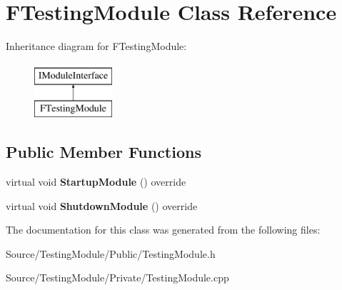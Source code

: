 \hypertarget{class_f_testing_module}{}\section{F\+Testing\+Module Class Reference}
\label{class_f_testing_module}
Inheritance diagram for F\+Testing\+Module\+:\begin{figure}[H]
\begin{center}
\leavevmode
\includegraphics[height=2.000000cm]{class_f_testing_module}
\end{center}
\end{figure}
\subsection*{Public Member Functions}
\begin{DoxyCompactItemize}
\item 
\mbox{\label{class_f_testing_module_a0d4c4e00c59e49db76da01eb960966f1}} 
virtual void {\bfseries Startup\+Module} () override
\item 
\mbox{\label{class_f_testing_module_afac07308b91f8a5d54a7934b055a2030}} 
virtual void {\bfseries Shutdown\+Module} () override
\end{DoxyCompactItemize}


The documentation for this class was generated from the following files\+:\begin{DoxyCompactItemize}
\item 
Source/\+Testing\+Module/\+Public/Testing\+Module.\+h\item 
Source/\+Testing\+Module/\+Private/Testing\+Module.\+cpp\end{DoxyCompactItemize}
